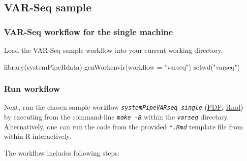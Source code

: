 \documentclass[14pt,]{article}
\newcommand{\hlstr}[1]{\textcolor[rgb]{0.251,0.627,0.251}{#1}}%
\newcommand{\hlstd}[1]{\textcolor[rgb]{0.251,0.251,0.251}{#1}}%
\newcommand{\hlkwc}[1]{\textcolor[rgb]{0.251,0.251,0.251}{#1}}%
\newcommand{\hlkwd}[1]{\textcolor[rgb]{0.878,0.439,0.125}{#1}}%
\newenvironment{Shaded}{\begin{myshaded}}{\end{myshaded}}
\newcommand{\KeywordTok}[1]{\hlkwd{#1}}
\newcommand{\DataTypeTok}[1]{\hlkwc{#1}}
\newcommand{\StringTok}[1]{\hlstr{#1}}
\newcommand{\NormalTok}[1]{\hlstd{#1}}
\begin{document}
\hypertarget{var-seq-sample}{%
\subsection{VAR-Seq sample}\label{var-seq-sample}}

\hypertarget{var-seq-workflow-for-the-single-machine}{%
\subsubsection{VAR-Seq workflow for the single machine}\label{var-seq-workflow-for-the-single-machine}}

Load the VAR-Seq sample workflow into your current working directory.

\begin{Shaded}
\begin{Highlighting}[]
\KeywordTok{library}\NormalTok{(systemPipeRdata)}
\KeywordTok{genWorkenvir}\NormalTok{(}\DataTypeTok{workflow =} \StringTok{"varseq"}\NormalTok{)}
\KeywordTok{setwd}\NormalTok{(}\StringTok{"varseq"}\NormalTok{)}
\end{Highlighting}
\end{Shaded}

\hypertarget{run-workflow-2}{%
\subsubsection{Run workflow}\label{run-workflow-2}}

Next, run the chosen sample workflow \emph{\texttt{systemPipeVARseq\_single}} (\href{https://github.com/tgirke/systemPipeRdata/blob/master/inst/extdata/workflows/varseq/systemPipeVARseq_single.pdf?raw=true}{PDF}, \href{https://github.com/tgirke/systemPipeRdata/blob/master/inst/extdata/workflows/varseq/systemPipeVARseq_single.Rmd}{Rmd}) by executing from the command-line \emph{\texttt{make -B}} within the \emph{\texttt{varseq}} directory. Alternatively, one can run the code from the provided \emph{\texttt{*.Rmd}} template file from within R interactively.

The workflow includes following steps:
\end{document}
